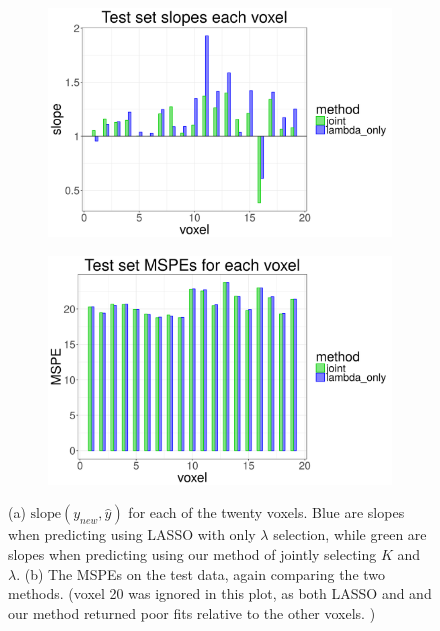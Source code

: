\documentclass[main]{subfiles}
\begin{document}
\begin{figure}[!h]
	\centering
	\begin{subfigure}[t]{0.45\textwidth}
		\includegraphics[width = \textwidth]{./single_response_fmri_figures/fmri_slopes.png}
	\end{subfigure}
	\begin{subfigure}[t]{0.45\textwidth}
		\includegraphics[width = \textwidth]{./single_response_fmri_figures/fmri_mspe.png}
	\end{subfigure}
  \caption{(a) $\text{slope}(y_{new}, \hat y)$ for each of the twenty voxels. Blue are slopes when predicting using
	LASSO with only $\lambda$ selection, while green are slopes when predicting using
	our method of jointly selecting $K$ and $\lambda$. (b) The MSPEs on the test data, again comparing the two methods.
	(voxel 20 was ignored in this plot, as both LASSO and and our method returned poor fits relative to the other voxels. )}
	\label{fig:fmri_single_response_results}
\end{figure}
\end{document}
